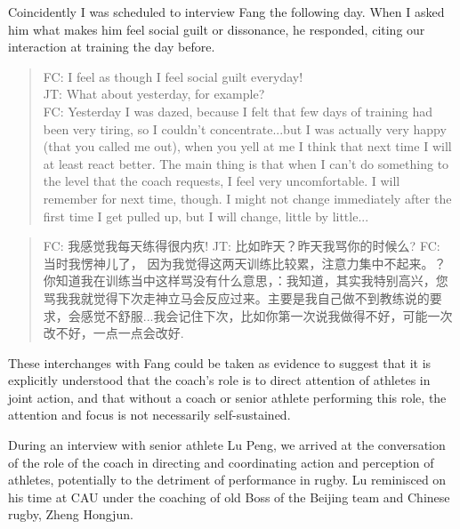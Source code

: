\begin{CJK}{UTF8}{gbsn}
  Coincidently I was scheduled to interview Fang the following day.  When I asked him what makes him feel social guilt or dissonance, he responded, citing our interaction at training the day before.

  \begin{quotation}
    FC: I feel as though I feel social guilt everyday! \\
    JT: What about yesterday, for example? \\
    FC: Yesterday I was dazed, because I felt that few days of training had been very tiring, so I couldn't concentrate...but I was actually very happy (that you called me out), when you yell at me I think that next time I will at least react better.  The main thing is that when I can't do something to the level that the coach requests, I feel very uncomfortable.  I will remember for next time, though.  I might not change immediately after the first time I get pulled up, but I will change, little by little... \\
  \end{quotation}


  \begin{quotation}
    FC: 我感觉我每天练得很内疚!
    JT: 比如昨天？昨天我骂你的时候么?
    FC: 当时我愣神儿了， 因为我觉得这两天训练比较累，注意力集中不起来。？你知道我在训练当中这样骂没有什么意思，：我知道，其实我特别高兴，您骂我我就觉得下次走神立马会反应过来。主要是我自己做不到教练说的要求，会感觉不舒服...我会记住下次，比如你第一次说我做得不好，可能一次改不好，一点一点会改好.
  \end{quotation}



  These interchanges with Fang could be taken as evidence to suggest that it is explicitly understood that the coach's role is to direct attention of athletes in joint action, and that without a coach or senior athlete performing this role, the attention and focus is not necessarily self-sustained.

  During an interview with senior athlete Lu Peng, we arrived at the conversation of the role of the coach in directing and coordinating action and perception of athletes, potentially to the detriment of performance in rugby. Lu reminisced on his time at CAU under the coaching of old Boss of the Beijing team and Chinese rugby, Zheng Hongjun.


\end{CJK}
